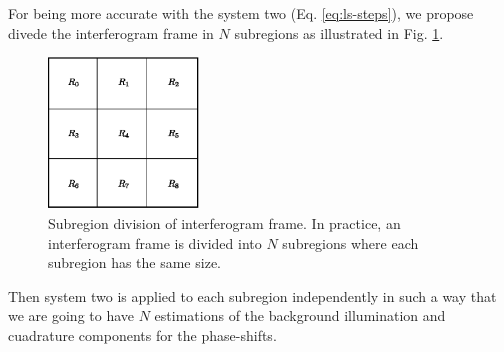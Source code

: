 \documentclass[letterpaper,12pt]{article}   %
\begin{document}
For being more accurate with the system two (Eq. \eqref{eq:ls-steps}),
we propose divede the interferogram frame in $N$ subregions as
illustrated in Fig. \ref{fig:subregions}.
\begin{figure}
  \centering
  \includegraphics[width=4cm]{regions.eps}
  \caption{Subregion division of interferogram frame. In practice, an
    interferogram frame is divided into $N$ subregions where each
    subregion has the same size.\label{fig:subregions}}
\end{figure}
Then system two is applied to each subregion independently in such a
way that we are going to have $N$ estimations of the background
illumination and cuadrature components for the phase-shifts.

 
\end{document}
